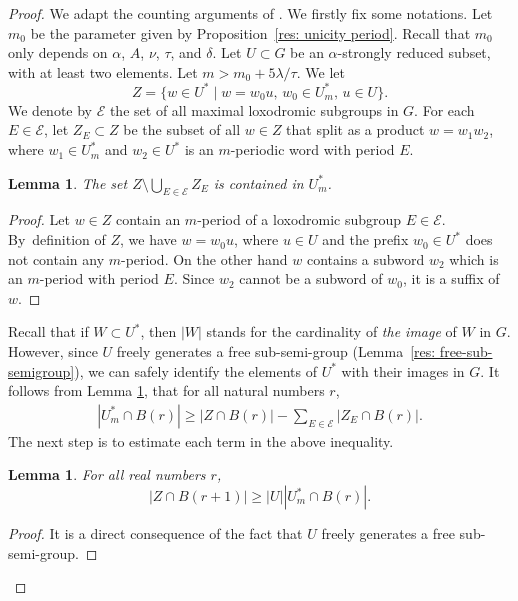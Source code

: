 \documentclass[11pt]{article}
\let\mathcal\mathscr
\theoremstyle{plain}
\newtheorem{lem}[thm]{Lemma}
\theoremstyle{definition}
\begin{document}
\begin{proof}
We adapt the counting arguments of \cite{coulon_growth_2013}.
We firstly fix some notations.
Let $m_0$ be the parameter given by Proposition~\ref{res: unicity period}.
Recall that $m_0$ only depends on $\alpha$, $A$, $\nu$, $\tau$, and $\delta$.
Let $U \subset G$ be an $\alpha$-strongly reduced subset, with at least two elements.
Let $m > m_0 + 5 \lambda/\tau$.
We let
\[
Z=\{ w\in U^* \mid w= w_0u ,\, w_0\in U^*_m ,\, u\in U\}.
\]
We denote by $\mathcal{E}$ the set of all maximal loxodromic subgroups in $G$.
For each $E \in \mathcal E$, let $Z_E\subset Z$ be the subset of all $w\in Z$ that split as a product $w=w_1w_2$, where $w_1 \in U^*_m$ and $w_2\in U^*$ is an $m$-periodic word with period $E$.

\begin{lem}\label{L: growth 2}
The set $Z\setminus \bigcup_{E\in \mathcal{E}}Z_E $ is contained in $U^*_m$.
\end{lem}
\begin{proof}
Let $w\in Z$ contain an $m$-period of a loxodromic subgroup $E \in \mathcal E$.
By~definition of $Z$, we have $w=w_0u$, where $u \in U$ and the prefix $w_0\in U^*$ does not contain any $m$-period.
On the other hand $w$ contains a subword $w_2$ which is an $m$-period with period $E$.
Since $w_2$ cannot be a subword of $w_0$, it is a suffix of $w$.
\end{proof}

Recall that if $W \subset U^*$, then $|W|$ stands for the cardinality of \emph{the image} of $W$ in $G$.
However, since $U$ freely generates a free sub-semi-group (Lemma~\ref{res: free-sub-semigroup}), we can safely identify the elements of $U^*$ with their images in $G$.
It follows from Lemma \ref{L: growth 2}, that for all natural numbers $r$,\vspace*{-3pt}
\begin{align}
\label{I: growth 1}
|U^*_m\cap B(r)| \geqslant |Z\cap B(r)| - \sum_{E\in \mathcal{E}} |Z_E \cap B(r)| .
\end{align}
The next step is to estimate each term in the above inequality.

\begin{lem} \label{I: growth 2}
For all real numbers $r$,\vspace*{-3pt}
\[
|Z\cap B(r+1)| \geqslant |U| |U^*_m \cap B(r)| .
\]
\end{lem}

\begin{proof}
It is a direct consequence of the fact that $U$ freely generates a free sub-semi-group.
\end{proof}


\end{proof}
\end{document}
